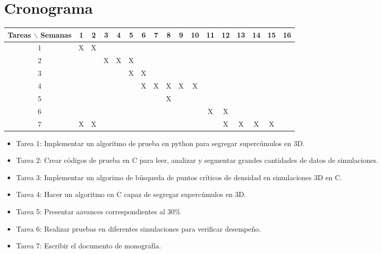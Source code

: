 \documentclass[12pt]{article}
\begin{document}
\section{Cronograma}

\begin{table}[htb]
	\begin{tabular}{|c|cccccccccccccccc| }
	\hline
	Tareas $\backslash$ Semanas & 1 & 2 & 3 & 4 & 5 & 6 & 7 & 8 & 9 & 10 & 11 & 12 & 13 & 14 & 15 & 16  \\
	\hline
	1 & X & X &   &    &   &   &   &   &   &   &   &   &   &   &   &   \\
	2 &   &   & X &  X & X &   &   &   &   &   &   &   &   &   &   &   \\
	3 &   &   &   &    & X &  X &  &  &   &   &   &   &   &   &   &   \\
	4 &   &   &   &    &   &   X & X & X & X & X &   &   &   &   &   &   \\
    5 &   &   &   &    &   &     &   & X &   &   &   &   &   &   &   &   \\
	6 &   &   &   &   &  &   &   &   &  &   &  X & X &   &   &  &   \\
    7 & X  &  X &   &   &  &   &   &   &   &   &   &  X&  X &  X &  X&   \\
	\hline
	\end{tabular}
\end{table}
\vspace{1mm}

\begin{itemize}
	\item Tarea 1: Implementar un algoritmo de prueba en python para segregar  supercúmulos en 3D.
	\item Tarea 2: Crear códigos de prueba en C para leer, analizar y segmentar grandes cantidades de datos de simulaciones.
    
	\item Tarea 3: Implementar un algorimo de búsqueda de puntos críticos de densidad en simulaciones 3D en C.
	\item Tarea 4: Hacer un algoritmo en C capaz de segregar supercúmulos en 3D.
    \item Tarea 5: Presentar aavances correspondientes al 30\%
    \item Tarea 6: Realizar pruebas en diferentes simulaciones para verificar desempeño.
    \item Tarea 7: Escribir el documento de monografía.
    
    
\end{itemize}
\end{document}
